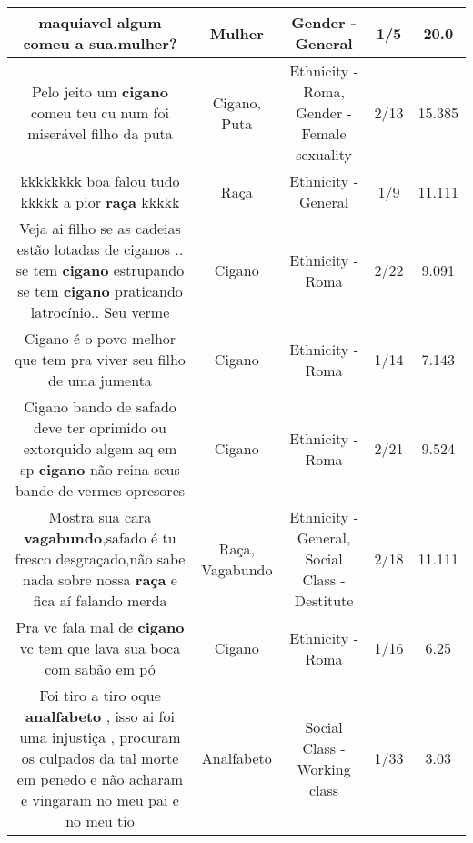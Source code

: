 \documentclass[11pt]{article}
\newlength\mylength
\begin{document}
\begin{center}
\begin{longtable}{|C{.65\mylength}|C{.30\mylength}|C{.12\mylength}|C{.12\mylength}|C{.12\mylength}|}
  \small maquiavel algum comeu a sua.\textbf{mulher}?\normalsize   & Mulher & Gender - General & 1/5 & 20.0 \\  \hline
  \small Pelo jeito um \textbf{cigano} comeu teu cu num foi miserável filho da puta\normalsize   & Cigano, Puta & Ethnicity - Roma, Gender - Female sexuality & 2/13 & 15.385 \\  \hline
  \small kkkkkkkk boa falou tudo kkkkk a pior \textbf{raça} kkkkk\normalsize   & Raça & Ethnicity - General & 1/9 & 11.111 \\  \hline
  \small Veja ai filho se as cadeias estão lotadas de ciganos .. se tem \textbf{cigano} estrupando se tem \textbf{cigano} praticando latrocínio.. Seu verme\normalsize   & Cigano & Ethnicity - Roma & 2/22 & 9.091 \\  \hline
  \small Cigano é o povo melhor que tem pra viver seu filho de uma jumenta\normalsize   & Cigano & Ethnicity - Roma & 1/14 & 7.143 \\  \hline
  \small Cigano bando de safado deve ter oprimido ou extorquido algem aq em sp \textbf{cigano} não reina seus bande de vermes opresores\normalsize   & Cigano & Ethnicity - Roma & 2/21 & 9.524 \\  \hline
  \small Mostra sua cara \textbf{vagabundo},safado é tu fresco desgraçado,não sabe nada sobre nossa \textbf{raça} e fica aí falando merda\normalsize   & Raça, Vagabundo & Ethnicity - General, Social Class - Destitute & 2/18 & 11.111 \\  \hline
  \small Pra vc fala mal de \textbf{cigano} vc tem que lava sua boca com sabão em pó\normalsize   & Cigano & Ethnicity - Roma & 1/16 & 6.25 \\  \hline
  \small Foi tiro a tiro oque \textbf{analfabeto} , isso ai foi uma injustiça , procuram os culpados da tal morte em penedo e não acharam e vingaram no meu pai e no meu tio\normalsize   & Analfabeto & Social Class - Working class & 1/33 & 3.03 \\  \hline
  
\end{longtable}
\end{center}
\end{document}
